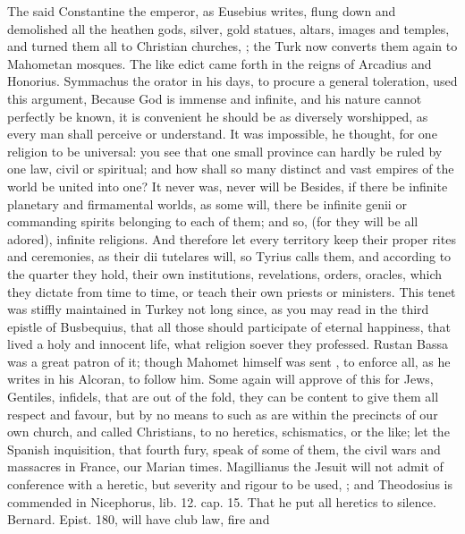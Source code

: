 {The said Constantine the emperor, as Eusebius writes, flung down and
demolished all the heathen gods, silver, gold statues, altars, images
and temples, and turned them all to Christian churches, ; the Turk now converts them
again to Mahometan mosques. The like edict came forth in the reigns of
Arcadius and Honorius. Symmachus the orator in his days, to
procure a general toleration, used this argument, Because God is
immense and infinite, and his nature cannot perfectly be known, it is
convenient he should be as diversely worshipped, as every man shall
perceive or understand. It was impossible, he thought, for one religion
to be universal: you see that one small province can hardly be ruled by
one law, civil or spiritual; and how shall so many distinct and vast
empires of the world be united into one? It never was, never will be
Besides, if there be infinite planetary and firmamental worlds, as
some will, there be infinite genii or commanding spirits
belonging to each of them; and so,  (for they will be all
adored), infinite religions. And therefore let every territory keep
their proper rites and ceremonies, as their dii tutelares will, so
Tyrius calls them, and according to the quarter they hold, their own
institutions, revelations, orders, oracles, which they dictate from
time to time, or teach their own priests or ministers. This tenet was
stiffly maintained in Turkey not long since, as you may read in the
third epistle of Busbequius, that all those should participate of
eternal happiness, that lived a holy and innocent life, what religion
soever they professed. Rustan Bassa was a great patron of it; though
Mahomet himself was sent , to enforce all, as he writes
in his Alcoran, to follow him. Some again will approve of this for
Jews, Gentiles, infidels, that are out of the fold, they can be content
to give them all respect and favour, but by no means to such as are
within the precincts of our own church, and called Christians, to no
heretics, schismatics, or the like; let the Spanish inquisition, that
fourth fury, speak of some of them, the civil wars and massacres in
France, our Marian times. Magillianus the Jesuit will not admit
of conference with a heretic, but severity and rigour to be used, ; and Theodosius is
commended in Nicephorus, lib. 12. cap. 15. That he put all
heretics to silence. Bernard. Epist. 180, will have club law, fire and
}
